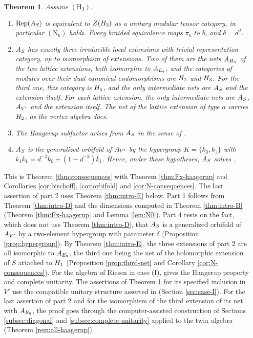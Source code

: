 \documentclass[leqno]{article}
\let\cal\relax
\newcommand{\cal}{\mathcal}
\DeclareMathOperator{\Rep}{Rep} %
\newtheorem{thm}{Theorem}[section]
\numberwithin{equation}{section}
\begin{document}
\begin{thm}
\label{thm:intro-C}
Assume $\mathrm{(H_J)}$.
\begin{enumerate}
\item $\Rep(\cal A_S)$ is equivalent to $Z(\cal H_3)$ as a unitary modular tensor category, in particular $\mathrm{(N_0)}$ holds. Every braided equivalence maps $\pi_b$ to $b$, and $\delta = d^2$.
\item $\cal A_S$ has exactly three irreducible local extensions with trivial representation category, up to isomorphism of extensions. Two of them are the nets $\cal A_{H_\Lambda}$ of the two lattice extensions, both isomorphic to $\cal A_{E_8}$, and the categories of modules over their dual canonical endomorphisms are $\cal H_2$ and $\cal H_3$. For the third one, this category is $\cal H_1$, and the only intermediate nets are $\cal A_S$ and the extension itself. For each lattice extension, the only intermediate nets are $\cal A_S$, $\cal A_{V'}$ and the extension itself. The net of the lattice extension of type $a$ carries $\cal H_2$, as the vertex algebra does.
\item The Haagerup subfactor arises from $\cal A_S$ in the sense of \cite[Definition 4.1 p.~20]{Bis17a}.
\item $\cal A_S$ is the generalized orbifold of $\cal A_{V'}$ by the hypergroup $K = \{k_0,k_1\}$ with $k_1k_1 = d^{-2}k_0+(1-d^{-2})k_1$. Hence, under these hypotheses, $\cal A_S$ solves \cite[Problem 4.27 p.~27]{Bis17b}.
\end{enumerate}
\end{thm}

This is Theorem \ref{thm:consequences} with Theorem \ref{thm:Fx-haagerup} and Corollaries \ref{cor:bischoff}, \ref{cor:orbifold} and \ref{cor:N-consequences}. The last assertion of part 2 uses Theorem \ref{thm:intro-E} below. Part 1 follows from Theorem \ref{thm:intro-D} and the dimensions computed in Theorem \ref{thm:intro-B} (Theorem \ref{thm:Fx-haagerup} and Lemma \ref{lem:N0}). Part 4 rests on the fact, which does not use Theorem \ref{thm:intro-D}, that $\cal A_S$ is a generalized orbifold of $\cal A_{V'}$ by a two-element hypergroup with parameter $\delta$ (Proposition \ref{prop:hypergroup}). By Theorem \ref{thm:intro-E}, the three extensions of part 2 are all isomorphic to $\cal A_{E_8}$, the third one being the net of the holomorphic extension of $S$ attached to $\cal H_1$ (Proposition \ref{prop:third-net} and Corollary \ref{cor:N-consequences}). For the algebra of Riesen in case (I), \cite[Theorem 7.13(1)--(2)]{ArhIII} gives the Haagerup property and complete unitarity. The assertions of Theorem \ref{thm:intro-C} for its specified inclusion in $V'$ use the compatible unitary structure asserted in \cite[Theorem 1 p.~1 and p.~4]{Rie26} (Section \ref{sec:case-I}). For the last assertion of part 2 and for the isomorphism of the third extension of its net with $\cal A_{E_8}$, the proof goes through the computer-assisted construction of Sections \ref{subsec:diagonal} and \ref{subsec:complete-unitarity} applied to the twin algebra (Theorem \ref{rem:all-haagerup}).
\end{document}
